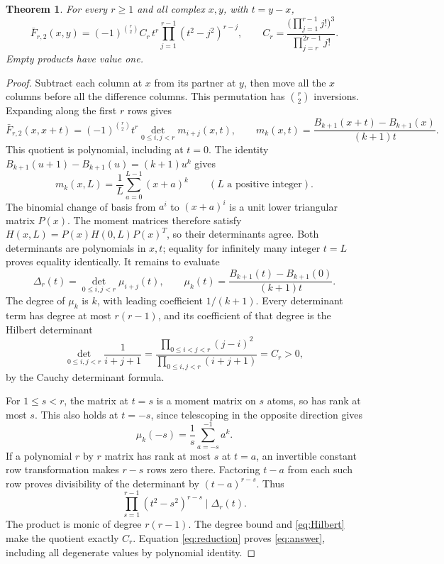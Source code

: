 \documentclass[11pt]{article}
\newtheorem{theorem}{Theorem}
\begin{document}
\begin{theorem}
For every $r\geq1$ and all complex $x,y$, with $t=y-x$,
\begin{equation}\label{eq:answer}
 \bar F_{r,2}(x,y)=(-1)^{\binom r2}C_r\,t^r
                    \prod_{j=1}^{r-1}(t^2-j^2)^{r-j},
 \qquad
 C_r=\frac{\bigl(\prod_{j=1}^{r-1}j!\bigr)^3}
                 {\prod_{j=r}^{2r-1}j!}.
\end{equation}
Empty products have value one.
\end{theorem}
\begin{proof}
Subtract each column at $x$ from its partner at $y$, then move all
the $x$ columns before all the difference columns. This permutation
has $\binom r2$ inversions. Expanding along the first $r$ rows gives
\begin{equation}\label{eq:reduction}
 \bar F_{r,2}(x,x+t)=(-1)^{\binom r2}t^r
             \det_{0\leq i,j<r}m_{i+j}(x,t),\qquad
 m_k(x,t)=\frac{B_{k+1}(x+t)-B_{k+1}(x)}{(k+1)t}.
\end{equation}
This quotient is polynomial, including at $t=0$.
The identity $B_{k+1}(u+1)-B_{k+1}(u)=(k+1)u^k$ gives
\[
 m_k(x,L)=\frac1L\sum_{a=0}^{L-1}(x+a)^k
 \qquad(L\text{ a positive integer}).
\]
The binomial change of basis from $a^i$ to $(x+a)^i$ is a unit
lower triangular matrix $P(x)$. The moment matrices therefore
satisfy $H(x,L)=P(x)H(0,L)P(x)^T$, so their determinants agree.
Both determinants are polynomials in $x,t$; equality for infinitely
many integer $t=L$ proves equality identically. It remains to evaluate
\[
 \Delta_r(t)=\det_{0\leq i,j<r}\mu_{i+j}(t),\qquad
 \mu_k(t)=\frac{B_{k+1}(t)-B_{k+1}(0)}{(k+1)t}.
\]
The degree of $\mu_k$ is $k$, with leading coefficient $1/(k+1)$.
Every determinant term has degree at most $r(r-1)$, and its
coefficient of that degree is the Hilbert determinant
\begin{equation}\label{eq:Hilbert}
 \det_{0\leq i,j<r}\frac1{i+j+1}
 =\frac{\prod_{0\leq i<j<r}(j-i)^2}
         {\prod_{0\leq i,j<r}(i+j+1)}
 =C_r>0,
\end{equation}
by the Cauchy determinant formula.

For $1\leq s<r$, the matrix at $t=s$ is a moment matrix on $s$
atoms, so has rank at most $s$. This also holds at $t=-s$, since
telescoping in the opposite direction gives
\[
 \mu_k(-s)=\frac1s\sum_{a=-s}^{-1}a^k.
\]
If a polynomial $r$ by $r$ matrix has rank at most $s$ at $t=a$,
an invertible constant row transformation makes $r-s$ rows zero
there. Factoring $t-a$ from each such row proves divisibility of
the determinant by $(t-a)^{r-s}$. Thus
\[
 \prod_{s=1}^{r-1}(t^2-s^2)^{r-s}\mid\Delta_r(t).
\]
The product is monic of degree $r(r-1)$. The degree bound and
\eqref{eq:Hilbert} make the quotient exactly $C_r$.
Equation \eqref{eq:reduction} proves \eqref{eq:answer}, including
all degenerate values by polynomial identity.
\end{proof}
\end{document}
